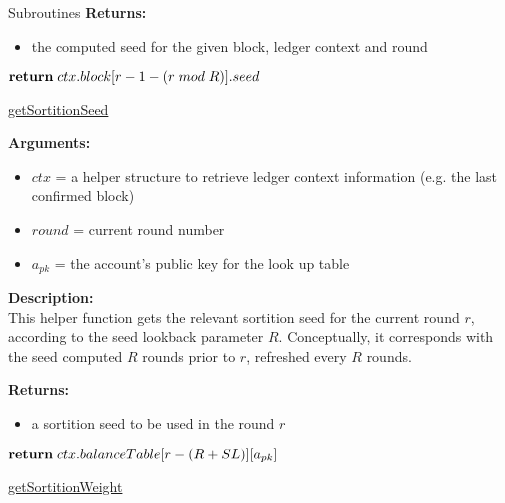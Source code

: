 \documentclass[10pt,a4paper]{article}
\begin{document}
\begin{section}{Subroutines}
\noindent \textbf{Returns:}
\begin{itemize}
    \item the computed seed for the given block, ledger context and round
  \end{itemize}


\begin{algorithm}[H]
    \begin{algorithmic}[1]
        
            $\Return\;ctx.block[r-1-(r\;mod\;R)].seed$

        \EndFunction
    \end{algorithmic}
    \caption{\underline{getSortitionSeed}}
\end{algorithm}

\noindent \textbf{Arguments:}
\begin{itemize}
    \item $ctx$ = a helper structure to retrieve ledger context information (e.g. the last confirmed block)
    \item $round$ = current round number
    \item $a_{pk}$ = the account's public key for the look up table
  \end{itemize}


\noindent \textbf{Description:}\\
This helper function gets the relevant sortition seed for the current round $r$, according to the seed lookback parameter $R$.
Conceptually, it corresponds with the seed computed $R$ rounds prior to $r$, refreshed every $R$ rounds.

\noindent \textbf{Returns:}
\begin{itemize}
    \item a sortition seed to be used in the round $r$
  \end{itemize}


\begin{algorithm}[H]
    \begin{algorithmic}[1]

            $\Return\;ctx.balanceTable[r - (R + SL)][a_{pk}]$

        \EndFunction
    \end{algorithmic}
    \caption{\underline{getSortitionWeight}}
\end{algorithm}


\end{section}
\end{document}
